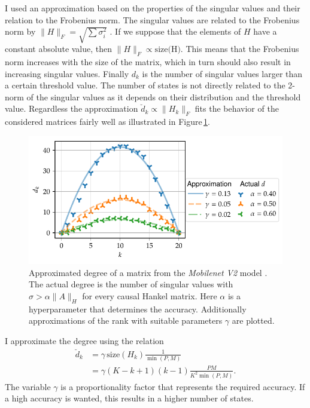 \documentclass[doctype=mastersthesis,BCOR=15mm,biblatex]{ldvbook}%
\begin{document}
I used an approximation based on the properties of the singular values and their relation to the Frobenius norm.
The singular values are related to the Frobenius norm by $\|H\|_F = \sqrt{\sum \sigma_i^2}$ \cite[p.~67]{bai_matrix_2021}.
If we suppose that the elements of $H$ have a constant absolute value, then $\|H\|_F \propto \text{size(H)}$.
This means that the Frobenius norm increases with the size of the matrix, which in turn should also result in increasing singular values.
Finally $d_k$ is the number of singular values larger than a certain threshold value.
The number of states is not directly related to the 2-norm of the singular values as it depends on their distribution and the threshold value.%
Regardless the approximation $\breve{d}_k \propto \|H_k\|_F$ fits the behavior of the considered matrices fairly well as illustrated in Figure\,\ref{fig:approx_degree}.
\begin{figure}[htb]
	\centering
	\includegraphics[width=\textwidth]{Plots/approx_degree.pdf}
	\caption{Approximated degree of a matrix from the \emph{Mobilenet V2} model \cite{sandler_mobilenetv2_2019}.
	The actual degree is the number of singular values with $\sigma > \alpha \|A\|_H$ for every causal Hankel matrix. Here $\alpha$ is a hyperparameter that determines the accuracy.
	Additionally approximations of the rank with suitable parameters $\gamma$ are plotted.}
	\label{fig:approx_degree}
\end{figure}
I approximate the degree using the relation
\begin{align}\label{eq:approx_d}
	\breve{d}_k 
	&= \gamma \,\text{size}(H_k) \frac{1}{\min(P,M)}\\
	&= \gamma (K-k+1)(k-1)\frac{PM}{K^2\min(P,M)}.
\end{align}
The variable $\gamma$ is a proportionality factor that represents the required accuracy. 
If a high accuracy is wanted, this results in a higher number of states. 
\end{document}
